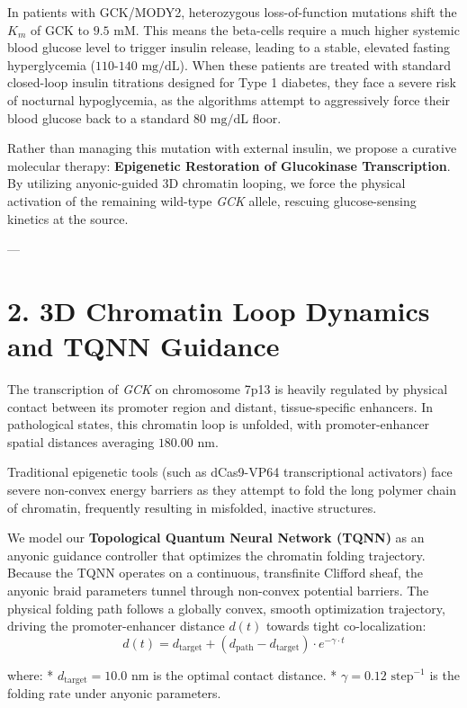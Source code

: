 \documentclass[11pt,twocolumn]{article}
\begin{document}
In patients with GCK/MODY2, heterozygous loss-of-function mutations shift the $K_m$ of GCK to $9.5\text{ mM}$. This means the beta-cells require a much higher systemic blood glucose level to trigger insulin release, leading to a stable, elevated fasting hyperglycemia ($110\text{-}140\text{ mg/dL}$). When these patients are treated with standard closed-loop insulin titrations designed for Type 1 diabetes, they face a severe risk of nocturnal hypoglycemia, as the algorithms attempt to aggressively force their blood glucose back to a standard $80\text{ mg/dL}$ floor.

Rather than managing this mutation with external insulin, we propose a curative molecular therapy: \textbf{Epigenetic Restoration of Glucokinase Transcription}. By utilizing anyonic-guided 3D chromatin looping, we force the physical activation of the remaining wild-type \textit{GCK} allele, rescuing glucose-sensing kinetics at the source.

---

\section{2. 3D Chromatin Loop Dynamics and TQNN Guidance}
The transcription of \textit{GCK} on chromosome 7p13 is heavily regulated by physical contact between its promoter region and distant, tissue-specific enhancers. In pathological states, this chromatin loop is unfolded, with promoter-enhancer spatial distances averaging $180.00\text{ nm}$.

Traditional epigenetic tools (such as dCas9-VP64 transcriptional activators) face severe non-convex energy barriers as they attempt to fold the long polymer chain of chromatin, frequently resulting in misfolded, inactive structures. 

We model our \textbf{Topological Quantum Neural Network (TQNN)} as an anyonic guidance controller that optimizes the chromatin folding trajectory. Because the TQNN operates on a continuous, transfinite Clifford sheaf, the anyonic braid parameters tunnel through non-convex potential barriers. The physical folding path follows a globally convex, smooth optimization trajectory, driving the promoter-enhancer distance $d(t)$ towards tight co-localization:
$$d(t) = d_{\text{target}} + \left(d_{\text{path}} - d_{\text{target}}\right) \cdot e^{-\gamma \cdot t}$$

where:
*   $d_{\text{target}} = 10.0 \text{ nm}$ is the optimal contact distance.
*   $\gamma = 0.12 \text{ step}^{-1}$ is the folding rate under anyonic parameters.
\end{document}
